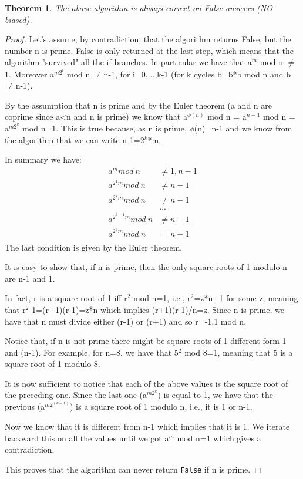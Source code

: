 \documentclass[a4paper, 12pt]{report}
\newtheorem{theorem}{\textbf{Theorem}}
\begin{document}
\begin{theorem}
	The above algorithm is always correct on False answers (NO-biased).
\end{theorem}

\begin{proof}
	Let's assume, by contradiction, that the algorithm returns False, but the number n is prime. False is only returned at the last step, which means that the algorithm "survived" all the if branches. In particular we have that a$^m$ mod n $\ne$1. Moreover a$^{m2^i}$ mod n $\ne$n-1, for i=0,...,k-1 (for k cycles b=b*b mod n and b $\ne$n-1).
	
	By the assumption that n is prime and by the Euler theorem (a and n are coprime since a<n and n is prime) we know that a$^{\phi(n)}$ mod n = a$^{n-1}$ mod n = a$^{m2^k}$ mod n=1. This is true because, as n is prime, $\phi$(n)=n-1 and we know from the algorithm that we can write n-1=2$^k$*m.
	
	In summary we have:
	\begin{align*}
		a^m mod \ n &\ne 1,n-1\\
		a^{{2^1}m} mod \ n &\ne n-1\\
		a^{{2^2}m} mod \ n &\ne n-1\\
		&...\\
		a^{{2^{k-1}}m} mod \ n &\ne n-1\\
		a^{{2^k}m} mod \ n &= n-1\\		
	\end{align*}
	The last condition is given by the Euler theorem.
	
	It is easy to show that, if n is prime, then the only square roots of 1 modulo n are n-1 and 1.
	
	In fact, r is a square root of 1 iff r$^2$ mod n=1, i.e., r$^2$=z*n+1 for some z, meaning that r$^2$-1=(r+1)(r-1)=z*n which implies (r+1)(r-1)/n=z. Since n is prime, we have that n must divide either (r-1) or (r+1) and so r=-1,1 mod n.
	
	Notice that, if n is not prime there might be square roots of 1 different form 1 and (n-1). For example, for n=8, we have that 5$^2$ mod 8=1, meaning that 5 is a square root of 1 modulo 8.
	
	It is now sufficient to notice that each of the above values is the square root of the preceding one. Since the last one (a$^{m2^k}$) is equal to 1, we have that the previous (a$^{m2^{(k-1)}}$) is a square root of 1 modulo n, i.e., it is 1 or n-1.
	
	Now we know that it is different from n-1 which implies that it is 1. We iterate backward this on all the values until we got a$^m$ mod n=1 which gives a contradiction.
	
	This proves that the algorithm can never return \texttt{False} if n is prime.

\end{proof}
\end{document}
